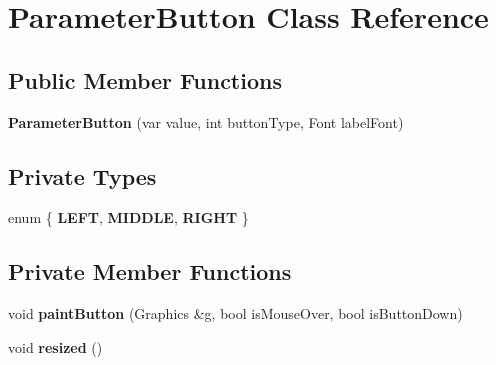 \hypertarget{classParameterButton}{\section{Parameter\-Button Class Reference}
\label{classParameterButton}
}
\subsection*{Public Member Functions}
\begin{DoxyCompactItemize}
\item 
\hypertarget{classParameterButton_a7a59b296f37ce92795e3017d56dd8bcd}{{\bfseries Parameter\-Button} (var value, int button\-Type, Font label\-Font)}\label{classParameterButton_a7a59b296f37ce92795e3017d56dd8bcd}

\end{DoxyCompactItemize}
\subsection*{Private Types}
\begin{DoxyCompactItemize}
\item 
enum \{ {\bfseries L\-E\-F\-T}, 
{\bfseries M\-I\-D\-D\-L\-E}, 
{\bfseries R\-I\-G\-H\-T}
 \}
\end{DoxyCompactItemize}
\subsection*{Private Member Functions}
\begin{DoxyCompactItemize}
\item 
\hypertarget{classParameterButton_a22a9563ef2a093d9cb7afea8d3d9356d}{void {\bfseries paint\-Button} (Graphics \&g, bool is\-Mouse\-Over, bool is\-Button\-Down)}\label{classParameterButton_a22a9563ef2a093d9cb7afea8d3d9356d}

\item 
\hypertarget{classParameterButton_a36fb863b412ede301507f9fe2fb01614}{void {\bfseries resized} ()}\label{classParameterButton_a36fb863b412ede301507f9fe2fb01614}

\end{DoxyCompactItemize}
